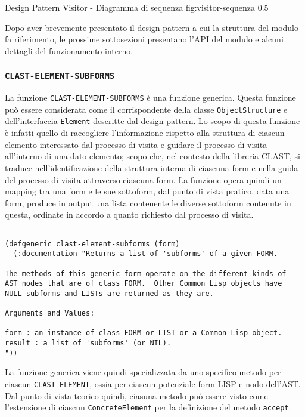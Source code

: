       {Design Pattern Visitor - Diagramma di sequenza}
      {fig:visitor-sequenza}
      {0.5}

Dopo aver brevemente presentato il design pattern a cui la struttura del
modulo fa riferimento, le prossime sottosezioni presentano l'API del modulo e
alcuni dettagli del funzionamento interno.

\subsubsection{\texttt{CLAST-ELEMENT-SUBFORMS}}

La funzione \texttt{CLAST-ELEMENT-SUBFORMS} è una funzione generica. Questa
funzione può essere considerata come il corrispondente della classe
\texttt{ObjectStructure} e dell'interfaccia \texttt{Element} descritte dal
design pattern. Lo scopo di questa funzione è infatti quello di raccogliere
l'informazione rispetto alla struttura di ciascun elemento interessato dal
processo di visita e guidare il processo di visita all'interno di una dato
elemento; scopo che, nel contesto della libreria CLAST, si traduce
nell'identificazione della struttura interna di ciascuna form e nella guida
del processo di visita attraverso ciascuna form. La funzione opera quindi un
mapping tra una form e le sue sottoform, dal punto di vista pratico, data una
form, produce in output una lista contenente le diverse sottoform contenute in
questa, ordinate in accordo a quanto richiesto dal processo di visita.

\begin{lstlisting}[caption=Definizione della funzione \texttt
{CLAST-ELEMENT-SUBFORMS}]

(defgeneric clast-element-subforms (form)
  (:documentation "Returns a list of 'subforms' of a given FORM.

The methods of this generic form operate on the different kinds of
AST nodes that are of class FORM.  Other Common Lisp objects have
NULL subforms and LISTs are returned as they are.

Arguments and Values:

form : an instance of class FORM or LIST or a Common Lisp object.
result : a list of 'subforms' (or NIL).
"))

\end{lstlisting}

La funzione generica viene quindi specializzata da uno specifico metodo per
ciascun \texttt{CLAST-ELEMENT}, ossia per ciascun potenziale form LISP e nodo
dell'AST. Dal punto di vista teorico quindi, ciasuna metodo può essere visto
come l'estensione di ciascun \texttt{ConcreteElement} per la definizione del
metodo \texttt{accept}.\\

